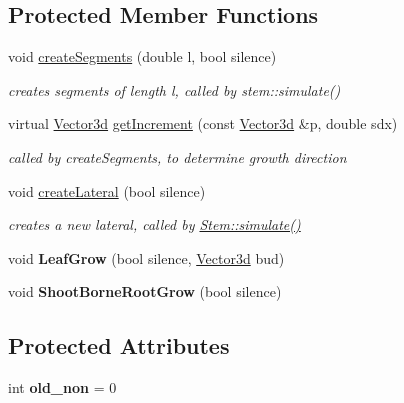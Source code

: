 \subsection*{Protected Member Functions}
\begin{DoxyCompactItemize}
\item 
void \hyperlink{classCPlantBox_1_1Stem_a9f08383c2fc5f0927a2ff3a5ecd5f0a5}{create\+Segments} (double l, bool silence)
\begin{DoxyCompactList}\small\item\em creates segments of length l, called by stem\+::simulate() \end{DoxyCompactList}\item 
\mbox{\label{classCPlantBox_1_1Stem_af52cbbcfd7a66a15a8086112e6884b55}} 
virtual \hyperlink{classCPlantBox_1_1Vector3d}{Vector3d} \hyperlink{classCPlantBox_1_1Stem_af52cbbcfd7a66a15a8086112e6884b55}{get\+Increment} (const \hyperlink{classCPlantBox_1_1Vector3d}{Vector3d} \&p, double sdx)
\begin{DoxyCompactList}\small\item\em called by create\+Segments, to determine growth direction \end{DoxyCompactList}\item 
void \hyperlink{classCPlantBox_1_1Stem_a8645ec8904c0b5207f6c37f7dd5e2d53}{create\+Lateral} (bool silence)
\begin{DoxyCompactList}\small\item\em creates a new lateral, called by \hyperlink{classCPlantBox_1_1Stem_ad2f7f8607fe02dbe2f4d4335248cf90b}{Stem\+::simulate()} \end{DoxyCompactList}\item 
\mbox{\label{classCPlantBox_1_1Stem_ace5fd7c768e0bfeed4e79b19602c73ba}} 
void {\bfseries Leaf\+Grow} (bool silence, \hyperlink{classCPlantBox_1_1Vector3d}{Vector3d} bud)
\item 
\mbox{\label{classCPlantBox_1_1Stem_a88d43db9a6db9d4fc486382299f42f68}} 
void {\bfseries Shoot\+Borne\+Root\+Grow} (bool silence)
\end{DoxyCompactItemize}
\subsection*{Protected Attributes}
\begin{DoxyCompactItemize}
\item 
\mbox{\label{classCPlantBox_1_1Stem_a902a39bc26284867191a92afb84368ac}} 
int {\bfseries old\+\_\+non} = 0
\end{DoxyCompactItemize}
